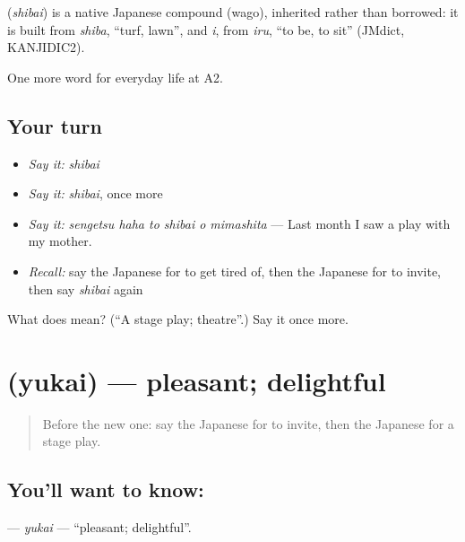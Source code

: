 \begin{cousinweb}
\textbf{} (\emph{shibai}) is a native Japanese compound (wago), inherited rather than borrowed: it is built from \emph{shiba}, \textquotedblleft{}turf, lawn\textquotedblright{}, and \emph{i}, from \emph{iru}, \textquotedblleft{}to be, to sit\textquotedblright{} (JMdict, KANJIDIC2).
\end{cousinweb}

\begin{grammarlens}[title={What you've built}]
One more word for everyday life at A2.
\end{grammarlens}

\subsection*{Your turn}
\begin{itemize}
\raggedright
  \item \emph{Say it:} \emph{shibai}
  \item \emph{Say it:} \emph{shibai}, once more
  \item \emph{Say it:} \emph{sengetsu haha to shibai o mimashita} — Last month I saw a play with my mother.
  \item \emph{Recall:} say the Japanese for to get tired of, then the Japanese for to invite, then say \emph{shibai} again
\end{itemize}

\begin{tcolorbox}[breakable,colback=teal!4,colframe=teal!35!black,title={Before you move on}]
What does  mean? (\textquotedblleft{}A stage play; theatre\textquotedblright{}.) Say it once more.
\end{tcolorbox}
\section[\texorpdfstring{\ja{ゆかい} (yukai)}{ゆかい (yukai)}]{ (yukai) — pleasant; delightful}

\label{lesson:JA-C241-yukai}



\begin{quote}
Before the new one: say the Japanese for to invite, then the Japanese for a stage play.
\end{quote}

\subsection*{You'll want to know: }
\textbf{} — \emph{yukai} — \textquotedblleft{}pleasant; delightful\textquotedblright{}.

